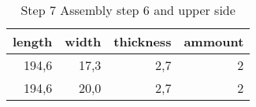 \begin{table}[h!]
\centering
\caption{Step 7 Assembly step 6 and upper side}
\begin{tabular}{rrrr}
\toprule
 length &  width &  thickness &  ammount \\
\midrule
  194,6 &   17,3 &        2,7 &        2 \\
  194,6 &   20,0 &        2,7 &        2 \\
\bottomrule
\end{tabular}
\end{table}
